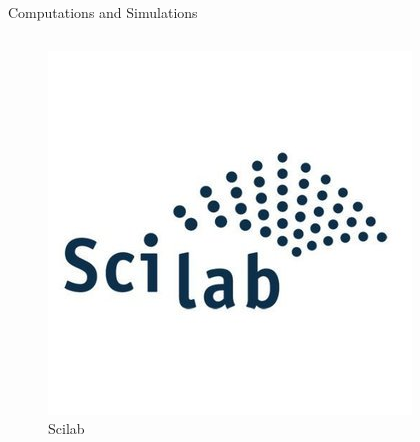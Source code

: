 \documentclass[10pt]{beamer}
\begin{document}
\begin{frame}{Computations and Simulations}
\begin{columns}
\begin{column}{0.5\textwidth}
\begin{figure}
                \end{figure}
                \begin{figure}
                    \includegraphics[height=0.2\paperheight]{images/scilab}
                    \caption{Scilab}
                \end{figure}
            \end{column}
        \end{columns}
    \end{frame}
\end{document}
